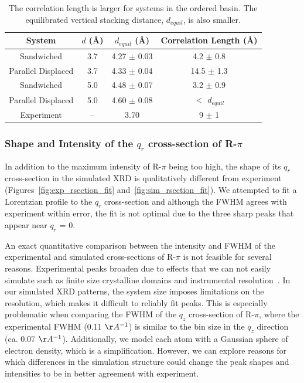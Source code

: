 \documentclass[journal=jpcbfk,manuscript=article]{achemso}
\begin{document}
  \begin{table}[h]
  \centering
  \begin{tabular}{cccc}
  \toprule
  System             & $\mathit{d}$ (\AA) & $\mathit{d}_{equil}$ (\AA) & Correlation Length (\AA) \\
  \midrule
  Sandwiched         & 3.7                &    4.27 $\pm$ 0.03         & 4.2 $\pm$ 0.8            \\
  Parallel Displaced & 3.7                &    4.33 $\pm$ 0.04         & 14.5 $\pm$ 1.3           \\ 
  Sandwiched         & 5.0                &    4.48 $\pm$ 0.07         & 3.2 $\pm$ 0.9            \\
  Parallel Displaced & 5.0                &    4.60 $\pm$ 0.08         & $<$ $d_{equil}$ \\ 
  Experiment         & --                 &    3.70                    & 9 $\pm$ 1               \\
  \bottomrule
  \end{tabular}
  \caption{The correlation length is larger for systems in the ordered basin.
	  The equilibrated vertical stacking distance, $\mathit{d}_{equil}$, is also
	  smaller.}
  \label{table:correlation_length}
  \end{table}

  \subsubsection*{Shape and Intensity of the $q_r$ cross-section of R-$\pi$}

  In addition to the maximum intensity of R-$\pi$ being too high, the shape
  of its $q_r$ cross-section in the simulated XRD is qualitatively different
  from experiment (Figures~\ref{fig:exp_rsection_fit}
  and~\ref{fig:sim_rsection_fit}). We attempted to fit a Lorentzian profile to 
  the $q_r$ cross-section and although the FWHM agrees with experiment within
  error, the fit is not optimal due to the three sharp peaks that appear near
  $q_r$ = 0. 
  
  An exact quantitative comparison between the intensity and FWHM of the
  experimental and simulated cross-sections of R-$\pi$ is not feasible for
  several reasons. Experimental peaks broaden due to effects that we can not
  easily simulate such as finite size crystalline domains and instrumental
  resolution~\cite{girolami_x-ray_2016}. In our simulated XRD patterns, 
  the system size imposes limitations
  on the resolution, which makes it difficult to reliably fit peaks. This is
  especially problematic when comparing the FWHM of the $q_z$ cross-section of
  R-$\pi$, where the experimental FWHM (0.11 $\AA^{-1}$) is similar to the bin
  size in the $q_z$ direction (ca. 0.07 $\AA^{-1}$).  Additionally, we model each
  atom with a Gaussian sphere of electron density, which is a simplification.
  However, we can explore reasons for which differences in the simulation
  structure could change the peak shapes and intensities to be in better
  agreement with experiment.
   
\end{document}
